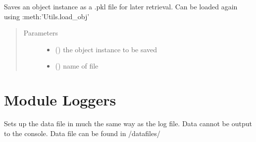\documentclass[letterpaper,10pt,english]{sphinxmanual}
\begin{document}

\begin{fulllineitems}
\label{\detokenize{source/laboratory.utils:laboratory.utils.data.save_obj}}
Saves an object instance as a .pkl file for later retrieval. Can be loaded again using :meth:’Utils.load\_obj’
\begin{quote}\begin{description}
\item[{Parameters}] \leavevmode\begin{itemize}
\item {} 
 () \textendash{} the object instance to be saved

\item {} 
 () \textendash{} name of file

\end{itemize}

\end{description}\end{quote}

\end{fulllineitems}



\section{Module Loggers}
\label{\detokenize{source/laboratory.utils:module-laboratory.utils.loggers}}\label{\detokenize{source/laboratory.utils:module-loggers}}

\begin{fulllineitems}
\label{\detokenize{source/laboratory.utils:laboratory.utils.loggers.data}}
Sets up the data file in much the same way as the log file.
Data cannot be output to the console. Data file can be found in
/datafiles/

\end{fulllineitems}
\end{document}

